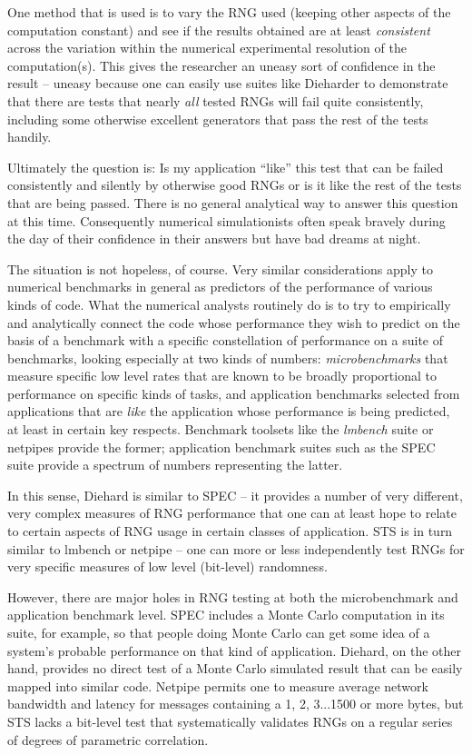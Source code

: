 \documentclass[12pt]{article}
\begin{document}
One method that is used is to vary the RNG used (keeping other aspects
of the computation constant) and see if the results obtained are at
least {\em consistent} across the variation within the numerical
experimental resolution of the computation(s).  This gives the
researcher an uneasy sort of confidence in the result -- uneasy because
one can easily use suites like Dieharder to demonstrate that there are
tests that nearly {\em all} tested RNGs will fail quite consistently,
including some otherwise excellent generators that pass the rest of the
tests handily.  

Ultimately the question is:  Is my application ``like'' this test that
can be failed consistently and silently by otherwise good RNGs or is it
like the rest of the tests that are being passed.  There is no general
analytical way to answer this question at this time.  Consequently
numerical simulationists often speak bravely during the day of their
confidence in their answers but have bad dreams at night.

The situation is not hopeless, of course.  Very similar considerations
apply to numerical benchmarks in general as predictors of the
performance of various kinds of code.  What the numerical analysts
routinely do is to try to empirically and analytically connect the code
whose performance they wish to predict on the basis of a benchmark with
a specific constellation of performance on a suite of benchmarks,
looking especially at two kinds of numbers:  {\em microbenchmarks} that
measure specific low level rates that are known to be broadly
proportional to performance on specific kinds of tasks, and application
benchmarks selected from applications that are {\em like} the
application whose performance is being predicted, at least in certain
key respects.  Benchmark toolsets like the {\em lmbench}
suite\cite{McVoy} or netpipes\cite{netpipe} provide the former;
application benchmark suites such as the SPEC suite\cite{SPEC} provide a
spectrum of numbers representing the latter.

In this sense, Diehard is similar to SPEC -- it provides a number of
very different, very complex measures of RNG performance that one can at
least hope to relate to certain aspects of RNG usage in certain classes
of application.  STS is in turn similar to lmbench or netpipe -- one can
more or less independently test RNGs for very specific measures of low
level (bit-level) randomness.

However, there are major holes in RNG testing at both the microbenchmark
and application benchmark level.  SPEC includes a Monte Carlo
computation in its suite, for example, so that people doing Monte Carlo
can get some idea of a system's probable performance on that kind of
application.  Diehard, on the other hand, provides no direct test of a
Monte Carlo simulated result that can be easily mapped into similar
code.  Netpipe permits one to measure average network bandwidth and
latency for messages containing a 1, 2, 3...1500 or more bytes, but STS
lacks a bit-level test that systematically validates RNGs on a regular
series of degrees of parametric correlation.
\end{document}
